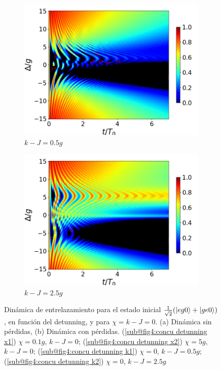 \begin{figure}[H]
\begin{subfigure}{0.49\textwidth}
        \includegraphics[width=\textwidth]{figuras/ch4/concu/delta/eg1+ge1 k=0.5g x=0.0g J=0.0g gamma=0.25g concu delta dis.png}
        \caption{$k-J=0.5g$}
        \label{fig4:concu detunning 1 k1}
    \end{subfigure}
    \hfill
    \begin{subfigure}{0.49\textwidth}
        \includegraphics[width=\textwidth]{figuras/ch4/concu/delta/eg1+ge1 k=2.5g x=0.0g J=0.0g gamma=0.25g concu delta dis.png}
        \caption{$k-J=2.5g$}
        \label{fig4:concu detunning 1 k2}
    \end{subfigure}
    \caption{Dinámica de entrelazamiento para el estado inicial $\frac{1}{\sqrt{2}}(\ket{eg0}+\ket{ge0})$, en función del detunning, y para $\chi=k-J=0$. (a) Dinámica sin pérdidas, (b) Dinámica con pérdidas. (\ref{sub@fig4:concu detunning x1}) $\chi=0.1g$, $k-J=0$; (\ref{sub@fig4:concu detunning x2}) $\chi=5g$, $k-J=0$; (\ref{sub@fig4:concu detunning k1}) $\chi=0$, $k-J=0.5g$; (\ref{sub@fig4:concu detunning k2}) $\chi=0$, $k-J=2.5g$ }
    \label{fig4:concu detunning 1}
\end{figure}

